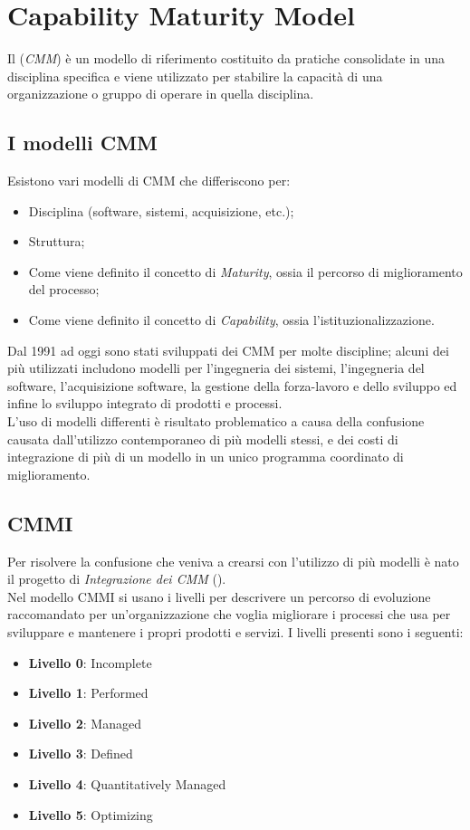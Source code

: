 \newpage

\section{Capability Maturity Model}
Il  (\textit{CMM}) è un modello di riferimento costituito
da pratiche consolidate in una disciplina specifica e viene utilizzato per stabilire la
capacità di una organizzazione o gruppo di operare in quella disciplina.

\subsection{I modelli CMM}
Esistono vari modelli di CMM che differiscono per:

\begin{itemize}
	\item Disciplina (software, sistemi, acquisizione, etc.);
	\item Struttura;
	\item Come viene definito il concetto di \textit{Maturity}, ossia il percorso di miglioramento del processo;
	\item Come viene definito il concetto di \textit{Capability}, ossia l'istituzionalizzazione.
\end{itemize}
Dal 1991 ad oggi sono stati sviluppati dei CMM per molte discipline; alcuni dei
più utilizzati includono modelli per l'ingegneria dei sistemi, l'ingegneria del software, l'acquisizione software, la gestione della forza-lavoro e dello sviluppo ed infine lo sviluppo
integrato di prodotti e processi. \\
L'uso di modelli differenti è risultato problematico a causa della confusione causata dall'utilizzo contemporaneo di più modelli stessi, e dei costi di integrazione di più di un modello in un unico programma coordinato di miglioramento.

\subsection{CMMI}
Per risolvere la confusione che veniva a crearsi con l'utilizzo di più modelli è nato
il progetto di \textit{Integrazione dei CMM} (). \\
Nel modello CMMI si usano i livelli per descrivere un percorso di evoluzione raccomandato per un'organizzazione che voglia migliorare i processi che usa per sviluppare e mantenere i propri prodotti e servizi. I livelli presenti sono i seguenti:
\begin{itemize}
	\item \textbf{Livello 0}: Incomplete
	\item \textbf{Livello 1}: Performed
	\item \textbf{Livello 2}: Managed
	\item \textbf{Livello 3}: Defined
	\item \textbf{Livello 4}: Quantitatively Managed
	\item \textbf{Livello 5}: Optimizing
\end{itemize}

